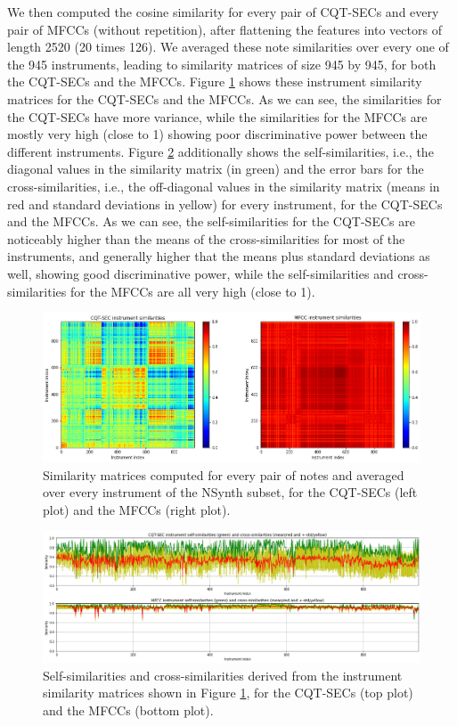 \documentclass[journal]{IEEEtran}
\begin{document}
We then computed the cosine similarity for every pair of CQT-SECs and every pair of MFCCs (without repetition), after flattening the features into vectors of length 2520 (20 times 126). We averaged these note similarities over every one of the 945 instruments, leading to similarity matrices of size 945 by 945, for both the CQT-SECs and the MFCCs. Figure \ref{fig:instrument_similarities} shows these instrument similarity matrices for the CQT-SECs and the MFCCs. As we can see, the similarities for the CQT-SECs have more variance, while the similarities for the MFCCs are mostly very high (close to 1) showing poor discriminative power between the different instruments. Figure \ref{fig:instrument_similarities2} additionally shows the self-similarities, i.e., the diagonal values in the similarity matrix (in green) and the error bars for the cross-similarities, i.e., the off-diagonal values in the similarity matrix (means in red and standard deviations in yellow) for every instrument, for the CQT-SECs and the MFCCs. As we can see, the self-similarities for the CQT-SECs are noticeably higher than the means of the cross-similarities for most of the instruments, and generally higher that the means plus standard deviations as well, showing good discriminative power, while the self-similarities and cross-similarities for the MFCCs are all very high (close to 1).

\begin{figure}[htp]
    \centering
    \includegraphics[width=\textwidth]{instrument_similarities.png}
    \caption{Similarity matrices computed for every pair of notes and averaged over every instrument of the NSynth subset, for the CQT-SECs (left plot) and the MFCCs (right plot).}
    \label{fig:instrument_similarities}
\end{figure}

\begin{figure}[htp]
    \centering
    \includegraphics[width=\textwidth]{instrument_similarities2.png}
    \caption{Self-similarities and cross-similarities derived from the instrument similarity matrices shown in Figure \ref{fig:instrument_similarities}, for the CQT-SECs (top plot) and the MFCCs (bottom plot).}
    \label{fig:instrument_similarities2}
\end{figure}
\end{document}
